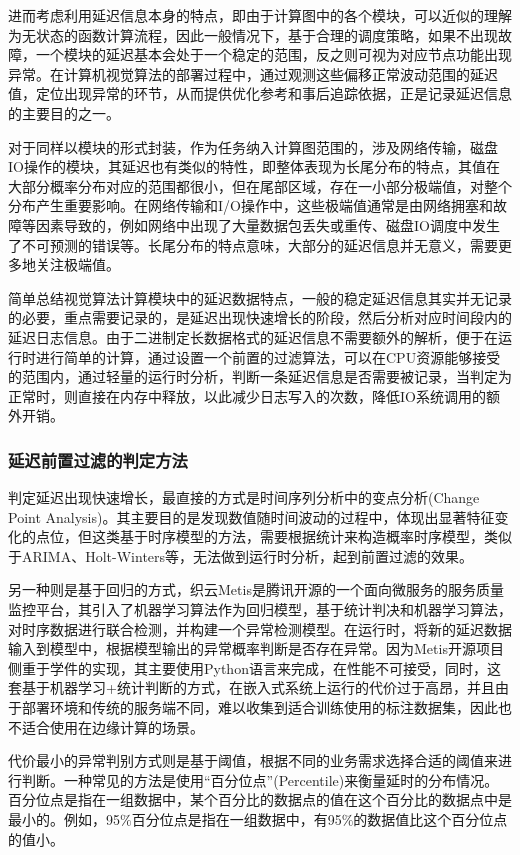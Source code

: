 \documentclass[master,anonymous]{shtthesis}
\begin{document}
进而考虑利用延迟信息本身的特点，即由于计算图中的各个模块，可以近似的理解为无状态的函数计算流程，因此一般情况下，基于合理的调度策略，如果不出现故障，一个模块的延迟基本会处于一个稳定的范围，反之则可视为对应节点功能出现异常。在计算机视觉算法的部署过程中，通过观测这些偏移正常波动范围的延迟值，定位出现异常的环节，从而提供优化参考和事后追踪依据，正是记录延迟信息的主要目的之一。

对于同样以模块的形式封装，作为任务纳入计算图范围的，涉及网络传输，磁盘IO操作的模块，其延迟也有类似的特性，即整体表现为长尾分布的特点\cite{dean2013tail}，其值在大部分概率分布对应的范围都很小，但在尾部区域，存在一小部分极端值，对整个分布产生重要影响。在网络传输和I/O操作中，这些极端值通常是由网络拥塞和故障等因素导致的，例如网络中出现了大量数据包丢失或重传、磁盘IO调度中发生了不可预测的错误等。长尾分布的特点意味，大部分的延迟信息并无意义，需要更多地关注极端值。

简单总结视觉算法计算模块中的延迟数据特点，一般的稳定延迟信息其实并无记录的必要，重点需要记录的，是延迟出现快速增长的阶段，然后分析对应时间段内的延迟日志信息。由于二进制定长数据格式的延迟信息不需要额外的解析，便于在运行时进行简单的计算，通过设置一个前置的过滤算法，可以在CPU资源能够接受的范围内，通过轻量的运行时分析，判断一条延迟信息是否需要被记录，当判定为正常时，则直接在内存中释放，以此减少日志写入的次数，降低IO系统调用的额外开销。

\subsubsection{延迟前置过滤的判定方法}\label{延迟前置过滤的判定方法}
判定延迟出现快速增长，最直接的方式是时间序列分析中的变点分析(Change Point Analysis)。其主要目的是发现数值随时间波动的过程中，体现出显著特征变化的点位，但这类基于时序模型的方法，需要根据统计来构造概率时序模型，类似于ARIMA\cite{kalpakis2001distance}、Holt-Winters\cite{chatfield1988holt}等，无法做到运行时分析，起到前置过滤的效果。

另一种则是基于回归的方式，织云Metis\cite{xia2019anomaly}是腾讯开源的一个面向微服务的服务质量监控平台，其引入了机器学习算法作为回归模型，基于统计判决和机器学习算法，对时序数据进行联合检测，并构建一个异常检测模型。在运行时，将新的延迟数据输入到模型中，根据模型输出的异常概率判断是否存在异常。因为Metis开源项目侧重于学件的实现，其主要使用Python语言来完成，在性能不可接受，同时，这套基于机器学习+统计判断的方式，在嵌入式系统上运行的代价过于高昂，并且由于部署环境和传统的服务端不同，难以收集到适合训练使用的标注数据集，因此也不适合使用在边缘计算的场景。

代价最小的异常判别方式则是基于阈值，根据不同的业务需求选择合适的阈值来进行判断。一种常见的方法是使用“百分位点”(Percentile)来衡量延时的分布情况。百分位点是指在一组数据中，某个百分比的数据点的值在这个百分比的数据点中是最小的。例如，95$\%$百分位点是指在一组数据中，有95$\%$的数据值比这个百分位点的值小。
\end{document}
